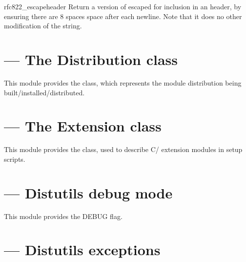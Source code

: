 \documentclass{manual}
\begin{document}
\begin{funcdesc}{rfc822_escape}{header}
Return a version of  escaped for inclusion in an
 header, by ensuring there are 8 spaces space after each newline.
Note that it does no other modification of the string.
\end{funcdesc}


\section{ --- The Distribution class}

This module provides the  class, which represents
the module distribution being built/installed/distributed.


\section{ --- The Extension class}

This module provides the  class, used to describe
C/\Cpp{} extension modules in setup scripts.


\section{ --- Distutils debug mode}

This module provides the DEBUG flag.

\section{ --- Distutils exceptions}
\end{document}
